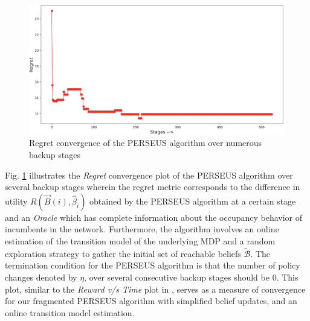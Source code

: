 \documentclass[10pt,twocolumn]{IEEEtran}
\begin{document}
\begin{figure}
    \centering
    \includegraphics[width=1.0\linewidth]{PerseusRegretConvergence.png}
    \caption{Regret convergence of the PERSEUS algorithm over numerous backup stages}
    \label{fig:5}
\end{figure}

Fig. \ref{fig:5} illustrates the \emph{Regret} convergence plot of the PERSEUS algorithm over several backup stages wherein the regret metric corresponds to the difference in utility $R(\vec{B}(i), \hat{\beta}_{i})$ obtained by the PERSEUS algorithm at a certain stage and an \emph{Oracle} which has complete information about the occupancy behavior of incumbents in the network. Furthermore, the algorithm involves an online estimation of the transition model of the underlying MDP and a random exploration strategy to gather the initial set of reachable beliefs $\tilde{\mathcal{B}}$. The termination condition for the PERSEUS algorithm is that the number of policy changes denoted by $\eta$, over several consecutive backup stages should be $0$. This plot, similar to the \emph{Reward v/s Time} plot in \cite{DBLP:journals/corr/abs-1109-2145}, serves as a measure of convergence for our fragmented PERSEUS algorithm with simplified belief updates, and an online transition model estimation.
\end{document}
